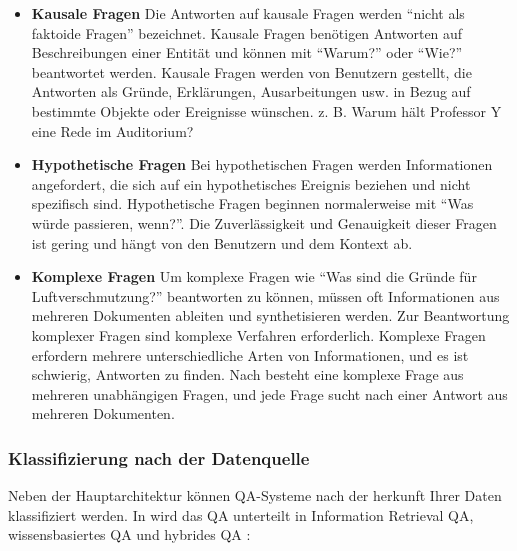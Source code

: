 \documentclass[
        ngerman,
        paper=a4,
        numbers=noendperiod,
]{scrreprt}
\begin{document}
\begin{itemize}
    \item \textbf{Kausale Fragen} 
    Die Antworten auf kausale Fragen werden \enquote{nicht als faktoide Fragen} bezeichnet. Kausale Fragen benötigen Antworten auf Beschreibungen einer Entität und können mit \enquote{Warum?} oder \enquote{Wie?} beantwortet werden. Kausale Fragen werden von Benutzern gestellt, die Antworten als Gründe, Erklärungen, Ausarbeitungen usw. in Bezug auf bestimmte Objekte oder Ereignisse wünschen.
    z. B. Warum hält Professor Y eine Rede im Auditorium?
    \item \textbf{Hypothetische Fragen}
    Bei hypothetischen Fragen werden Informationen angefordert, die sich auf ein hypothetisches Ereignis beziehen und nicht spezifisch sind. Hypothetische Fragen beginnen normalerweise mit \enquote{Was würde passieren, wenn?}. Die Zuverlässigkeit und Genauigkeit dieser Fragen ist gering und hängt von den Benutzern und dem Kontext ab.
    \item \textbf{Komplexe Fragen}
    Um komplexe Fragen wie \enquote{Was sind die Gründe für Luftverschmutzung?} beantworten zu können, müssen oft Informationen aus mehreren Dokumenten ableiten und synthetisieren werden. Zur Beantwortung komplexer Fragen sind komplexe Verfahren erforderlich. Komplexe Fragen erfordern mehrere unterschiedliche Arten von Informationen, und es ist schwierig, Antworten zu finden. Nach \citep{basuki2016statistical} besteht eine komplexe Frage aus mehreren unabhängigen Fragen, und jede Frage sucht nach einer Antwort aus mehreren Dokumenten.
    
\end{itemize}


\subsubsection{Klassifizierung nach der Datenquelle}
Neben der Hauptarchitektur können QA-Systeme nach der herkunft Ihrer Daten klassifiziert werden. In \citep{Jurafsky2014SpeechProcessing} wird das QA unterteilt in Information Retrieval QA,  wissensbasiertes QA und hybrides QA \citep{Ojokoh2019ASystems}:


\end{document}
